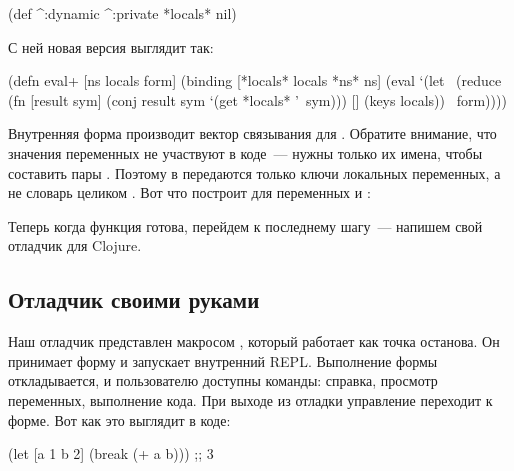 \begin{english}
  \begin{clojure}
(def ^:dynamic ^:private
  *locals* nil)
  \end{clojure}
\end{english}

С ней новая версия  выглядит так:

\begin{english}
  \begin{clojure/lines}
(defn eval+ [ns locals form]
  (binding [*locals* locals
            *ns* ns]
    (eval
     `(let ~(reduce
             (fn [result sym]
               (conj result sym `(get *locals* '~sym)))
             []
             (keys locals))
        ~form))))
  \end{clojure/lines}
\end{english}

Внутренняя форма   производит вектор связывания для . Обратите внимание, что значения переменных не участвуют в коде~--- нужны только их имена, чтобы составить пары . Поэтому в  передаются только ключи локальных переменных, а не словарь целиком . Вот что построит  для переменных  и :

\begin{english}
  \begin{clojure}
  \end{clojure}
\end{english}

Теперь когда функция  готова, перейдем к последнему шагу~--- напишем свой отладчик для Clojure.

\subsection{Отладчик своими руками}

\label{section-own-debugger}

Наш отладчик представлен макросом , который работает как точка останова. Он принимает форму и запускает внутренний REPL. Выполнение формы откладывается, и пользователю доступны команды: справка, просмотр переменных, выполнение кода. При выходе из отладки управление переходит к форме. Вот как это выглядит в коде:

\begin{english}
  \begin{clojure}
(let [a 1
      b 2]
  (break (+ a b)))
;; 3
  \end{clojure}
\end{english}

